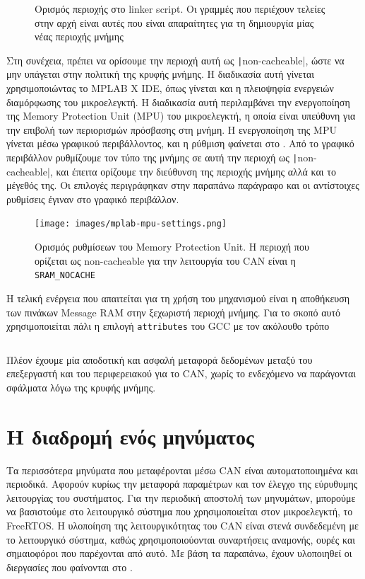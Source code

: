 \documentclass[a4paper,nobib,justified]{tufte-book}
\begin{document}
\begin{figure}
	\inputminted{c++}{code/examples/diff-linker.ld}
	\label{code:linker-diff}
	\caption[Ορισμός περιοχής στο linker script]{Ορισμός περιοχής στο linker script. Οι γραμμές που περιέχουν τελείες στην αρχή είναι αυτές που είναι απαραίτητες για τη δημιουργία μίας νέας περιοχής μνήμης}
\end{figure}

Στη συνέχεια, πρέπει να ορίσουμε την περιοχή αυτή ως \texttt|non-cacheable|, ώστε να μην υπάγεται στην πολιτική της κρυφής μνήμης. Η διαδικασία αυτή γίνεται χρησιμοποιώντας το MPLAB X IDE, όπως γίνεται και η πλειοψηφία ενεργειών διαμόρφωσης του μικροελεγκτή. Η διαδικασία αυτή περιλαμβάνει την ενεργοποίηση της Memory Protection Unit (MPU) του μικροελεγκτή, η οποία είναι υπεύθυνη για την επιβολή των περιορισμών πρόσβασης στη μνήμη. Η ενεργοποίηση της MPU γίνεται μέσω γραφικού περιβάλλοντος, και η ρύθμιση φαίνεται στο . Από το γραφικό περιβάλλον ρυθμίζουμε τον τύπο της μνήμης σε αυτή την περιοχή ως \texttt|non-cacheable|, και έπειτα ορίζουμε την διεύθυνση της περιοχής μνήμης αλλά και το μέγεθός της. Οι επιλογές περιγράφηκαν στην παραπάνω παράγραφο και οι αντίστοιχες ρυθμίσεις έγιναν στο γραφικό περιβάλλον.

\begin{figure}
	\texttt{[image: images/mplab-mpu-settings.png]}
	\label{fig:mpu-settings}
	\caption[Ορισμός ρυθμίσεων της MPU]{Ορισμός ρυθμίσεων του Memory Protection Unit. Η περιοχή που ορίζεται ως non-cacheable για την λειτουργία του CAN είναι η \texttt{SRAM\_NOCACHE}}
\end{figure}

Η τελική ενέργεια που απαιτείται για τη χρήση του μηχανισμού είναι η αποθήκευση των πινάκων Message RAM στην ξεχωριστή περιοχή μνήμης. Για το σκοπό αυτό χρησιμοποιείται πάλι η επιλογή \texttt{attributes} του GCC με τον ακόλουθο τρόπο \inputminted{c++}{code/examples/message-ram/full.cpp}

Πλέον έχουμε μία αποδοτική και ασφαλή μεταφορά δεδομένων μεταξύ του επεξεργαστή και του περιφερειακού για το CAN, χωρίς το ενδεχόμενο να παράγονται σφάλματα λόγω της κρυφής μνήμης.

\section{Η διαδρομή ενός μηνύματος}

Τα περισσότερα μηνύματα που μεταφέρονται μέσω CAN είναι αυτοματοποιημένα και περιοδικά. Αφορούν κυρίως την μεταφορά παραμέτρων και τον έλεγχο της εύρυθυμης λειτουργίας του συστήματος. Για την περιοδική αποστολή των μηνυμάτων, μπορούμε να βασιστούμε στο λειτουργικό σύστημα που χρησιμοποιείται στον μικροελεγκτή, το FreeRTOS. Η υλοποίηση της λειτουργικότητας του CAN είναι στενά συνδεδεμένη με το λειτουργικό σύστημα, καθώς χρησιμοποιούονται συναρτήσεις αναμονής, ουρές και σημαιοφόροι που παρέχονται από αυτό. Με βάση τα παραπάνω, έχουν υλοποιηθεί οι διεργασίες που φαίνονται στο .
\end{document}
